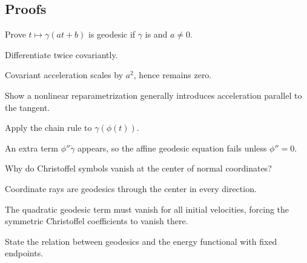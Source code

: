 \subsection*{Proofs}

\begin{exercise}\label{exr:vii23-ped-06}
Prove \(t\mapsto\gamma(at+b)\) is geodesic if \(\gamma\) is and \(a\ne0\).
\end{exercise}

\begin{hint}
Differentiate twice covariantly.
\end{hint}

\begin{solution}
Covariant acceleration scales by \(a^2\), hence remains zero.
\end{solution}

\begin{exercise}\label{exr:vii23-ped-07}
Show a nonlinear reparametrization generally introduces acceleration parallel to the tangent.
\end{exercise}

\begin{hint}
Apply the chain rule to \(\gamma(\phi(t))\).
\end{hint}

\begin{solution}
An extra term \(\phi''\dot\gamma\) appears, so the affine geodesic equation fails unless \(\phi''=0\).
\end{solution}

\begin{exercise}\label{exr:vii23-ped-08}
Why do Christoffel symbols vanish at the center of normal coordinates?
\end{exercise}

\begin{hint}
Coordinate rays are geodesics through the center in every direction.
\end{hint}

\begin{solution}
The quadratic geodesic term must vanish for all initial velocities, forcing the symmetric Christoffel coefficients to vanish there.
\end{solution}

\begin{exercise}\label{exr:vii23-ped-09}
State the relation between geodesics and the energy functional with fixed endpoints.
\end{exercise}

